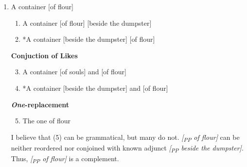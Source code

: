\documentclass[12pt,letterpaper]{article}
\newcommand{\qtl}[1]{\strut #1}
\newcommand{\ppb}[1]{\emph{[\textsubscript{PP} #1]}}
\begin{document}
\begin{enumerate}[label=\alph*)]
	\item A container [of flour]
	\par\vspace*{0.5ex}
	\begin{minipage}[c]{0.7\textwidth}
		\par\vspace{0.5ex}{\small\bfseries Reordering}
		\begin{enumerate}[label=(\arabic*),nosep]
			\item A container [of flour] [beside the dumpster]
			\item *A container [beside the dumpster] [of flour]
		\end{enumerate}
		{\small\bfseries Conjuction of Likes}
		\begin{enumerate}[label=(\arabic*),nosep]
			\setcounter{enumii}{2}
			\item A container [of souls] and [of flour]
			\item *A container [beside the dumpster] and [of flour]
		\end{enumerate}
		{\small\bfseries \emph{One}-replacement}
		\begin{enumerate}[label=(\arabic*),nosep]
			\setcounter{enumii}{4}
			\item The one of flour
		\end{enumerate}
	\end{minipage}\hfill\begin{minipage}[c]{0.2\textwidth}
		\hfill{}
	\end{minipage}

	\par\vspace*{2ex}
	I believe that (5) can be grammatical, but many do not. \ppb{of flour} can be neither
	reordered nor conjoined with known adjunct \ppb{beside the dumpster}. Thus, \ppb{of flour}
	is a complement.
	\par\vspace*{2ex}


\end{enumerate}
\end{document}
